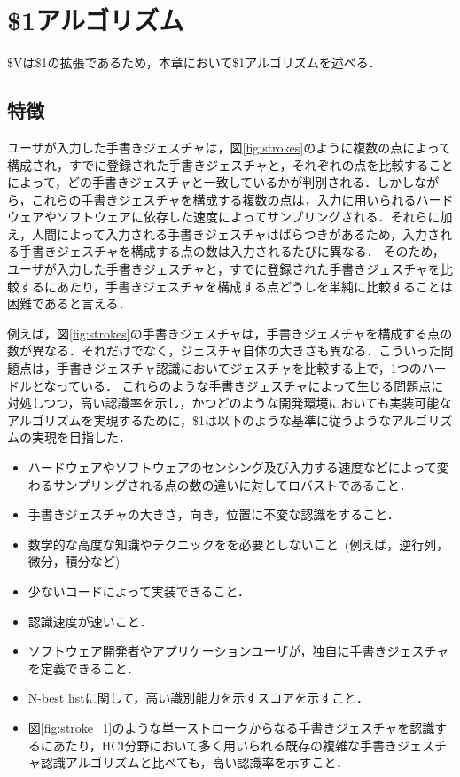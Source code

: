 \chapter{\$1アルゴリズム}
\$Vは\$1の拡張であるため，本章において\$1アルゴリズムを述べる．

\section{特徴}
ユーザが入力した手書きジェスチャは，図\ref{fig:strokes}のように複数の点によって構成され，すでに登録された手書きジェスチャと，それぞれの点を比較することによって，どの手書きジェスチャと一致しているかが判別される．しかしながら，これらの手書きジェスチャを構成する複数の点は，入力に用いられるハードウェアやソフトウェアに依存した速度によってサンプリングされる．それらに加え，人間によって入力される手書きジェスチャはばらつきがあるため，入力される手書きジェスチャを構成する点の数は入力されるたびに異なる．
そのため，ユーザが入力した手書きジェスチャと，すでに登録された手書きジェスチャを比較するにあたり，手書きジェスチャを構成する点どうしを単純に比較することは困難であると言える．


例えば，図\ref{fig:strokes}の手書きジェスチャは，手書きジェスチャを構成する点の数が異なる．それだけでなく，ジェスチャ自体の大きさも異なる．こういった問題点は，手書きジェスチャ認識においてジェスチャを比較する上で，1つのハードルとなっている．
これらのような手書きジェスチャによって生じる問題点に対処しつつ，高い認識率を示し，かつどのような開発環境においても実装可能なアルゴリズムを実現するために，\$1は以下のような基準に従うようなアルゴリズムの実現を目指した．

\begin{itemize}
\item ハードウェアやソフトウェアのセンシング及び入力する速度などによって変わるサンプリングされる点の数の違いに対してロバストであること．
\item 手書きジェスチャの大きさ，向き，位置に不変な認識をすること．
\item 数学的な高度な知識やテクニックをを必要としないこと~(例えば，逆行列，微分，積分など)
\item 少ないコードによって実装できること．
\item 認識速度が速いこと．
\item ソフトウェア開発者やアプリケーションユーザが，独自に手書きジェスチャを定義できること．
\item N-best listに関して，高い識別能力を示すスコアを示すこと．
\item 図\ref{fig:stroke_1}のような単一ストロークからなる手書きジェスチャを認識するにあたり，HCI分野において多く用いられる既存の複雑な手書きジェスチャ認識アルゴリズムと比べても，高い認識率を示すこと．
\end{itemize}

